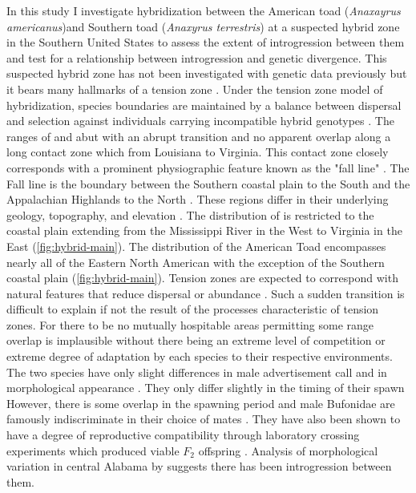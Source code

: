 In this study I investigate hybridization between the American toad 
(\textit{Anaxayrus americanus})and Southern toad (\textit{Anaxyrus terrestris}) 
at a suspected hybrid zone in the Southern United States to assess the extent of 
introgression between them and test for a relationship between introgression and 
genetic divergence. 
This suspected hybrid zone has not been investigated with genetic data previously 
but it bears many hallmarks of a tension zone \parencite{barton1985}. 
Under the tension zone model of hybridization, species boundaries are maintained
by a balance between dispersal and selection against individuals carrying incompatible 
hybrid genotypes \parencite{barton1985}. 
The ranges of \amer and \terr abut with an abrupt transition and no apparent overlap
along a long contact zone which from Louisiana to Virginia. 
This contact zone closely corresponds with a prominent physiographic feature known 
as the "fall line" \parencite{powell2016,mount1975}. 
The Fall line is the boundary between the Southern coastal plain to the South and 
the Appalachian Highlands to the North \parencite{shankman2007}.
These regions differ in their underlying geology, topography, and elevation \parencite{shankman2007}.
The distribution of \terr is restricted to the coastal plain extending from   
the Mississippi River in the West to Virginia in the East (\cref{fig:hybrid-main}).
The distribution of the American Toad encompasses nearly all of the Eastern North 
American with the exception of the Southern coastal plain (\cref{fig:hybrid-main}).
Tension zones are expected to correspond with natural features that reduce
dispersal or abundance \parencite{barton1979}.
Such a sudden transition is difficult to explain if not the result of 
the processes characteristic of tension zones. 
For there to be no mutually hospitable areas permitting some range overlap is 
implausible without there being an extreme level of competition or extreme degree 
of adaptation by each species to their respective environments.
The two species have only slight differences in male advertisement call and in 
morphological appearance \parencite{cocroft1995,weatherby1982}. 
They only differ slightly in the timing of their spawn \parencite{mount1975} 
However, there is some overlap in the spawning period and male Bufonidae 
are famously indiscriminate in their choice of mates \parencite{dordevic2014,weatherby1982}.
They have also been shown to have a degree of reproductive compatibility through 
laboratory crossing experiments which produced viable $F_2$ offspring \parencite{blair1963}. 
Analysis of morphological variation in central Alabama by \cite{weatherby1982} 
suggests there has been introgression between them. 



